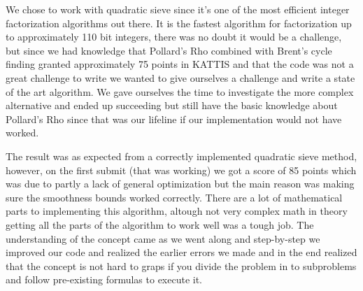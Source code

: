 We chose to work with quadratic sieve since it's one of the most efficient integer factorization algorithms out there. It is the fastest algorithm for factorization up to approximately 110 bit integers, there was no doubt it would be a challenge, but since we had knowledge that Pollard's Rho combined with Brent's cycle finding granted approximately 75 points in KATTIS and that the code was not a great challenge to write we wanted to give ourselves a challenge and write a state of the art algorithm. We gave ourselves the time to investigate the more complex alternative and ended up succeeding but still have the basic knowledge about Pollard's Rho since that was our lifeline if our implementation would not have worked.

The result was as expected from a correctly implemented quadratic sieve method, however, on the first submit (that was working) we got a score of 85 points which was due to partly a lack of general optimization but the main reason was making sure the smoothness bounds worked correctly. There are a lot of mathematical parts to implementing this algorithm, altough not very complex math in theory getting all the parts of the algorithm to work well was a tough job. The understanding of the concept came as we went along and step-by-step we improved our code and realized the earlier errors we made and in the end realized that the concept is not hard to graps if you divide the problem in to subproblems and follow pre-existing formulas to execute it.